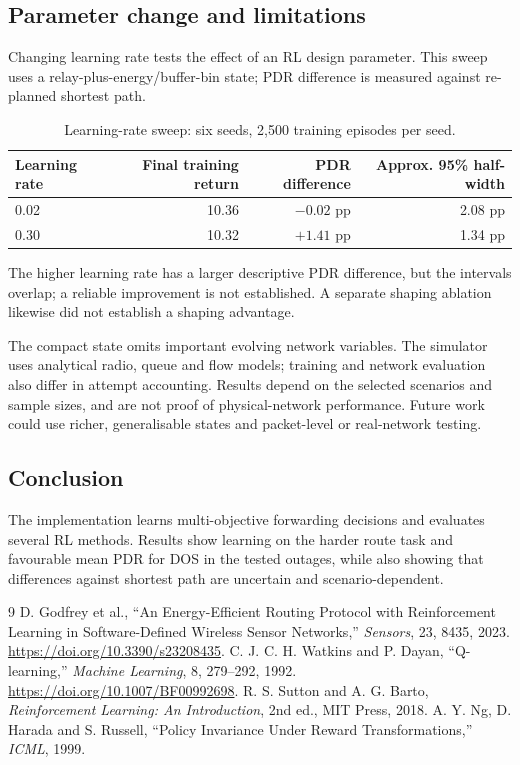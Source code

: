 \documentclass[11pt,a4paper]{article}
\begin{document}
\subsection{Parameter change and limitations}
Changing learning rate tests the effect of an RL design parameter. This sweep uses a relay-plus-energy/buffer-bin state; PDR difference is measured against re-planned shortest path.
\begin{table}[H]
\centering\small
\caption{Learning-rate sweep: six seeds, 2,500 training episodes per seed.}
\begin{tabularx}{\linewidth}{@{}lrrr@{}}\toprule
\textbf{Learning rate} & \textbf{Final training return} & \textbf{PDR difference} & \textbf{Approx. 95\% half-width}\\\midrule
0.02 & 10.36 & $-0.02$ pp & 2.08 pp\\
0.30 & 10.32 & $+1.41$ pp & 1.34 pp\\\bottomrule
\end{tabularx}
\end{table}
The higher learning rate has a larger descriptive PDR difference, but the intervals overlap; a reliable improvement is not established. A separate shaping ablation likewise did not establish a shaping advantage.

The compact state omits important evolving network variables. The simulator uses analytical radio, queue and flow models; training and network evaluation also differ in attempt accounting. Results depend on the selected scenarios and sample sizes, and are not proof of physical-network performance. Future work could use richer, generalisable states and packet-level or real-network testing.

\subsection{Conclusion}
The implementation learns multi-objective forwarding decisions and evaluates several RL methods. Results show learning on the harder route task and favourable mean PDR for DOS in the tested outages, while also showing that differences against shortest path are uncertain and scenario-dependent.

\begingroup\small
\begin{thebibliography}{9}\setlength{\itemsep}{0pt}
 D. Godfrey et al., ``An Energy-Efficient Routing Protocol with Reinforcement Learning in Software-Defined Wireless Sensor Networks,'' \emph{Sensors}, 23, 8435, 2023. \url{https://doi.org/10.3390/s23208435}.
 C. J. C. H. Watkins and P. Dayan, ``Q-learning,'' \emph{Machine Learning}, 8, 279--292, 1992. \url{https://doi.org/10.1007/BF00992698}.
 R. S. Sutton and A. G. Barto, \emph{Reinforcement Learning: An Introduction}, 2nd ed., MIT Press, 2018.
 A. Y. Ng, D. Harada and S. Russell, ``Policy Invariance Under Reward Transformations,'' \emph{ICML}, 1999.
\end{thebibliography}\endgroup
\end{document}

